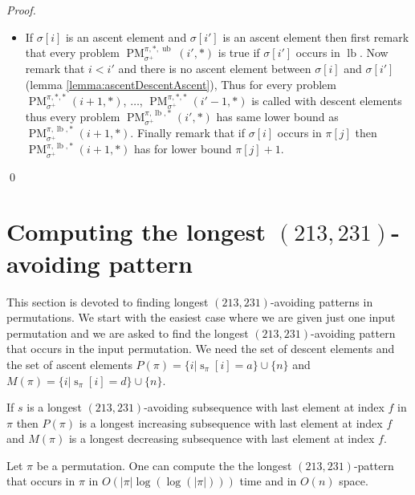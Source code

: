 \documentclass[a4paper]{llncs}
\newcommand{\ptext}{\pi}
\newcommand{\pmotif}{\sigma}
\DeclareMathOperator{\stripea}{s}
\newcommand{\stripe}[2]{\stripea_{{#1}}[{#2}]}
\newcommand{\dstep}{d}
\newcommand{\ustep}{a}
\newcommand{\pbmotif}{\pmotif^+}
\DeclareMathOperator{\PMa}{PM}
\newcommand{\PM}[6]{\PMa_{{#1}}^{{#2},{#3},{#4}}({#5},{#6})}
\DeclareMathOperator{\lb}{lb}
\DeclareMathOperator{\ub}{ub}
\begin{document}
\begin{proof}
\begin{itemize}
\begin{itemize}
			\item If $\pmotif[i]$ is an ascent element and $\pmotif[i']$ is an ascent element then
			first remark that every problem 
			$\PM{\pbmotif}{\ptext}{*}{\ub}{i'}{*}$ is true if $\sigma[i']$ occurs in $\lb$.
			Now remark that
			$i<i'$ and there is no  ascent element between $\pmotif[i]$ and $\pmotif[i']$ (lemma \ref{lemma:ascentDescentAscent}), 
			Thus for every problem $\PM{\pbmotif}{\ptext}{*}{*}{i+1}{*}$, $\dots$, $\PM{\pbmotif}{\ptext}{*}{*}{i'-1}{*}$ is called with descent elements
			thus every problem 
			$\PM{\pbmotif}{\ptext}{\lb}{*}{i'}{*}$ has same lower bound as $\PM{\pbmotif}{\ptext}{\lb}{*}{i+1}{*}$.
			Finally remark that if $\pmotif[i]$ occurs in $\ptext[j]$ then  $\PM{\pbmotif}{\ptext}{\lb}{*}{i+1}{*}$ has for lower bound $\ptext[j]+1$.			
		\end{itemize}
\end{itemize}
\qed
\end{proof}



\section{Computing the longest $(213,231)$-avoiding pattern}
\label{section:LCS}

	This section is devoted to finding longest $(213,231)$-avoiding patterns 
	in permutations.
	We start with the easiest case where we are given just one input permutation
	and we are asked to find the longest $(213,231)$-avoiding pattern that 
	occurs in the input permutation.
	We need the set of descent elements and the set of ascent elements
	$P(\pi) = \{i | \stripe{\pi}{i} = \ustep \} \cup \{n\}$ and
	$M(\pi) = \{i | \stripe{\pi}{i} = \dstep \} \cup \{n\}$.\\

	\begin{proposition}
	\label{proposition:longestIncreasingSubsequence}
	If $s$ is a longest $(213,231)$-avoiding subsequence with last element at index 
	$f$ in $\pi$ then
	$P(\pi)$ is a longest increasing subsequence with last element at index $f$ and
	$M(\pi)$ is a longest decreasing subsequence with last element at index $f$.
	\end{proposition}

	\begin{proposition}
	\label{proposition:longest 2}
	Let $\pi$ be a permutation. One can compute the
	the longest $(213,231)$-pattern that occurs in $\pi$
	in $O(|\ptext|\log(\log(|\ptext|)))$ time and in $O(n)$ space.
	\end{proposition}
\end{document}
